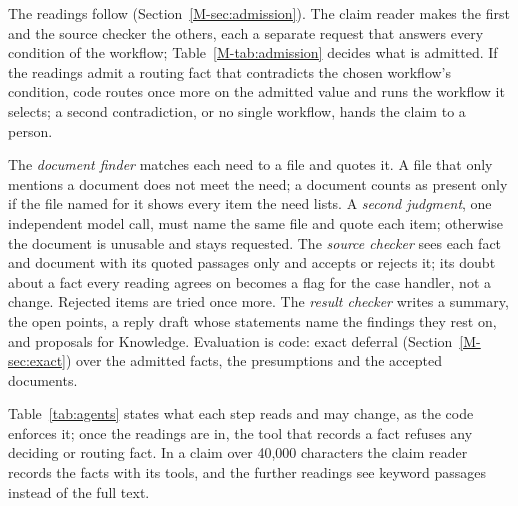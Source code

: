 The readings follow (Section~\ref{M-sec:admission}). The claim reader makes the first and the source checker the others, each a separate request that answers every condition of the workflow; Table~\ref{M-tab:admission} decides what is admitted. If the readings admit a routing fact that contradicts the chosen workflow's condition, code routes once more on the admitted value and runs the workflow it selects; a second contradiction, or no single workflow, hands the claim to a person.

The \emph{document finder} matches each need to a file and quotes it. A file that only mentions a document does not meet the need; a document counts as present only if the file named for it shows every item the need lists. A \emph{second judgment}, one independent model call, must name the same file and quote each item; otherwise the document is unusable and stays requested. The \emph{source checker} sees each fact and document with its quoted passages only and accepts or rejects it; its doubt about a fact every reading agrees on becomes a flag for the case handler, not a change. Rejected items are tried once more. The \emph{result checker} writes a summary, the open points, a reply draft whose statements name the findings they rest on, and proposals for Knowledge. Evaluation is code: exact deferral (Section~\ref{M-sec:exact}) over the admitted facts, the presumptions and the accepted documents.

Table~\ref{tab:agents} states what each step reads and may change, as the code enforces it; once the readings are in, the tool that records a fact refuses any deciding or routing fact. In a claim over 40,000 characters the claim reader records the facts with its tools, and the further readings see keyword passages instead of the full text.

